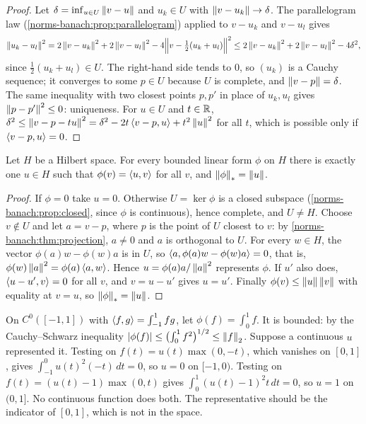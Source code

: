 \begin{notechapter}
\begin{proof}
Let $\delta = \inf_{u\in U}\left\|v - u\right\|$ and $u_k\in U$ with
$\left\|v - u_k\right\|\to\delta$. The parallelogram law
(\cref{norms-banach:prop:parallelogram}) applied to $v - u_k$ and
$v - u_l$ gives
\[
  \left\|u_k - u_l\right\|^2 = 2\left\|v - u_k\right\|^2 + 2\left\|v - u_l\right\|^2
  - 4\Bigl\|v - \tfrac12(u_k + u_l)\Bigr\|^2
  \leq2\left\|v - u_k\right\|^2 + 2\left\|v - u_l\right\|^2 - 4\delta^2 ,
\]
since $\frac12(u_k + u_l)\in U$. The right-hand side tends to $0$, so
$(u_k)$ is a Cauchy sequence; it converges to some $p\in U$ because $U$ is
complete, and $\left\|v - p\right\| = \delta$. The same inequality with two closest
points $p, p'$ in place of $u_k, u_l$ gives $\left\|p - p'\right\|^2\leq0$:
uniqueness. For $u\in U$ and $t\in\mathbb{R}$,
$\delta^2\leq\left\|v - p - tu\right\|^2 = \delta^2 - 2t\left\langle v - p, u \right\rangle
+ t^2\left\|u\right\|^2$ for all $t$, which is possible only if
$\left\langle v - p, u \right\rangle = 0$.
\end{proof}

\begin{theorem}
\label{norms-banach:thm:riesz}
Let $H$ be a Hilbert space. For every bounded linear form $\phi$ on $H$
there is exactly one $u\in H$ such that $\phi(v) = \left\langle u, v \right\rangle$ for all $v$,
and $\left\|\phi\right\|_* = \left\|u\right\|$.
\end{theorem}

\begin{proof}
If $\phi = 0$ take $u = 0$. Otherwise $U = \ker\phi$ is a closed subspace
(\cref{norms-banach:prop:closed}, since $\phi$ is continuous), hence
complete, and $U\neq H$. Choose $v\notin U$ and let $a = v - p$, where $p$
is the point of $U$ closest to $v$: by
\cref{norms-banach:thm:projection}, $a\neq0$ and $a$ is orthogonal to $U$.
For every $w\in H$, the vector $\phi(a)w - \phi(w)a$ is in $U$, so
$\left\langle a, \phi(a)w - \phi(w)a \right\rangle = 0$, that is,
$\phi(w)\left\|a\right\|^2 = \phi(a)\left\langle a, w \right\rangle$. Hence $u = \phi(a)a/\left\|a\right\|^2$
represents $\phi$. If $u'$ also does, $\left\langle u - u', v \right\rangle = 0$ for all $v$,
and $v = u - u'$ gives $u = u'$. Finally
$\phi(v)\leq\left\|u\right\|\left\|v\right\|$ with equality at $v = u$, so
$\left\|\phi\right\|_* = \left\|u\right\|$.
\end{proof}

\begin{example}
\label{norms-banach:ex:riesz-fails}
On $C^0([-1, 1])$ with $\left\langle f, g \right\rangle = \int_{-1}^1fg$, let
$\phi(f) = \int_0^1f$. It is bounded: by the Cauchy--Schwarz inequality
$\left|\phi(f)\right|\leq\bigl(\int_0^1f^2\bigr)^{1/2}\leq\left\|f\right\|_2$. Suppose a
continuous $u$ represented it. Testing on $f(t) = u(t)\max(0, -t)$, which
vanishes on $[0, 1]$, gives $\int_{-1}^0u(t)^2(-t)\,dt = 0$, so $u = 0$ on
$[-1, 0)$. Testing on $f(t) = (u(t) - 1)\max(0, t)$ gives
$\int_0^1(u(t) - 1)^2t\,dt = 0$, so $u = 1$ on $(0, 1]$. No continuous
function does both. The representative should be the indicator of
$[0, 1]$, which is not in the space.
\end{example}


\end{notechapter}
